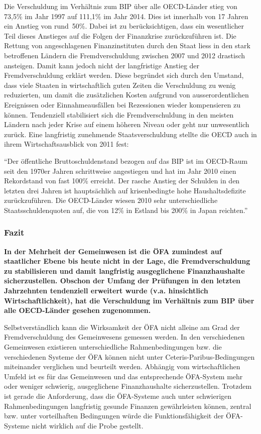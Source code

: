 \documentclass[10pt]{article}
\begin{document}
Die Verschuldung im Verhältnis zum BIP über alle OECD-Länder stieg von 73,5\% im Jahr 1997 auf 111,1\% im Jahr 2014. Dies ist innerhalb von 17 Jahren ein Anstieg von rund~50\%. Dabei ist zu berücksichtigen, dass ein wesentlicher Teil dieses Anstieges auf die Folgen der Finanzkrise zurückzuführen ist. Die Rettung von angeschlagenen Finanzinstituten durch den Staat liess in den stark betroffenen Ländern die Fremdverschuldung zwischen 2007 und 2012 drastisch ansteigen. Damit kann jedoch nicht der langfristige Anstieg der Fremdverschuldung erklärt werden. Diese begründet sich durch den Umstand, dass viele Staaten in wirtschaftlich guten Zeiten die Verschuldung zu wenig reduzierten, um damit die zusätzlichen Kosten aufgrund von ausserordentlichen Ereignissen oder Einnahmeausfällen bei Rezessionen wieder kompensieren zu können. Tendenziell stabilisiert sich die Fremdverschuldung in den meisten Ländern nach jeder Krise auf einem höheren Niveau oder geht nur unwesentlich zurück. Eine langfristig zunehmende Staatsverschuldung stellte die OECD auch in ihrem Wirtschaftsausblick von 2011 fest:

“{}Der öffentliche Bruttoschuldenstand bezogen auf das BIP ist im OECD-Raum seit den 1970er Jahren schrittweise angestiegen und hat im Jahr 2010 einen Rekordstand von fast 100\% erreicht. Der rasche Anstieg der Schulden in den letzten drei Jahren ist hauptsächlich auf krisenbedingte hohe Haushaltsdefizite zurückzuführen. Die OECD-Länder wiesen 2010 sehr unterschiedliche Staatsschuldenquoten auf, die von 12\% in Estland bis 200\% in Japan reichten.”{}

\subsubsection{Fazit}\label{subsubsec:fazit}
\textbf{In der Mehrheit der Gemeinwesen ist die ÖFA zumindest auf staatlicher Ebene bis heute nicht in der Lage, die Fremd­verschuldung zu stabilisieren und damit langfristig ausgeglichene Finanz­haushalte sicherzustellen. Obschon der Umfang der Prüfungen in den letzten Jahr­zehnten tendenziell erweitert wurde (v.a. hinsichtlich Wirtschaftlichkeit), hat die Verschuldung im Verhältnis zum BIP über alle OECD-Länder gesehen zuge­nommen. }

Selbstverständlich kann die Wirksamkeit der ÖFA nicht alleine am Grad der Fremdver­schuldung des Gemeinwesens gemessen werden. In den verschiedenen Gemeinwesen existieren unterschiedliche Rahmenbedingungen bzw. die verschiedenen Systeme der ÖFA können nicht unter Ceteris-Paribus-Bedingungen miteinander verglichen und beurteilt werden. Abhängig vom wirtschaftlichen Umfeld ist es für das Gemeinwesen und das entsprechende ÖFA-System mehr oder weniger schwierig, ausgeglichene Finanzhaushalte sicherzustellen. Trotzdem ist gerade die Anforderung, dass die ÖFA-Systeme auch unter schwierigen Rahmenbedingungen langfristig gesunde Finanzen gewährleisten können, zentral bzw. unter vorteilhaften Bedingungen würde die Funktionsfähigkeit der ÖFA-Systeme nicht wirklich auf die Probe gestellt.
\end{document}
